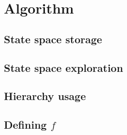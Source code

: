 \section{Algorithm}
\subsection{State space storage}
\subsection{State space exploration}
\subsection{Hierarchy usage}
\subsection{Defining $f$}